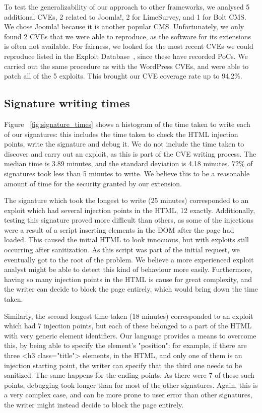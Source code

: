 To test the generalizability of our approach to other frameworks, we
analysed 5 additional CVEs, 2 related to Joomla!, 2 for LimeSurvey,
and 1 for Bolt CMS.  We chose Joomla! because it is another
popular \ac{CMS}. Unfortunately, we only found 2 CVEs
that we were able to reproduce, as the software for its extensions is
often not available. For fairness, we looked for the most recent CVEs
we could reproduce listed in the Exploit Database~\cite{exploitdb}, since
these have recorded \acp{PoC}. We carried out the same
procedure as with the WordPress CVEs, and were able to patch all of
the 5 exploits. This brought our CVE coverage rate up to 94.2\%.

\subsection{Signature writing times} \label{signature_times}

Figure ~\ref{fig:signature_times} shows a histogram of the time taken to write each of our signatures: this includes the time taken to check the HTML injection points, write the signature and debug it. We do not include the time taken to discover and carry out an exploit, as this is part of the CVE writing process. The median time is 3.89 minutes, and the standard deviation is 4.18 minutes. 72\% of signatures took less than 5 minutes to write. We believe this to be a reasonable amount of time for the security granted by our extension.

The signature which took the longest to write (25 minutes) corresponded to an exploit which had several injection points in the HTML, 12 exactly. Additionally, testing this signature proved more difficult than others, as some of the injections were a result of a script inserting elements in the DOM after the page had loaded. This caused the initial HTML to look innocuous, but with exploits still occurring after sanitization. As this script was part of the initial request, we eventually got to the root of the problem. We believe a more experienced exploit analyst might be able to detect this kind of behaviour more easily. Furthermore, having so many injection points in the HTML is cause for great complexity, and the writer can decide to block the page entirely, which would bring down the time taken.

Similarly, the second longest time taken (18 minutes) corresponded to an exploit which had 7 injection points, but each of these belonged to a part of the HTML with very generic element identifiers. Our language provides a means to overcome this, by being able to specify the element's "position": for example, if there are three <h3 class="title"> elements, in the HTML, and only one of them is an injection starting point, the writer can specify that the third one needs to be sanitized. The same happens for the ending points. As there were 7 of these such points, debugging took longer than for most of the other signatures. Again, this is a very complex case, and can be more prone to user error than other signatures, the writer might instead decide to block the page entirely.

